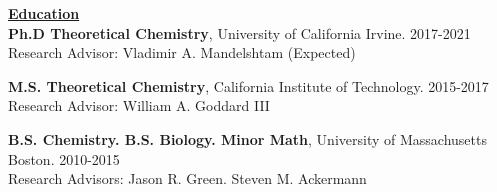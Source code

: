 \documentclass[letterpaper]{article}
\begin{document}

{\large \textbf{\underline{Education}}}\\

\textbf{Ph.D  Theoretical Chemistry}, University of California Irvine.
\hfill 2017-2021\\
Research Advisor: Vladimir A. Mandelshtam \null \hfill (Expected)\\
\vspace{0.1in}

\textbf{M.S. Theoretical Chemistry}, California Institute of Technology.
\hfill 2015-2017 \\
Research Advisor: William A. Goddard III\\
\vspace{0.1in}

\textbf{B.S. Chemistry. B.S. Biology. Minor Math}, University of
Massachusetts Boston. \hfill 2010-2015\\
Research Advisors: Jason R. Green. Steven M. Ackermann\\
\end{document}
